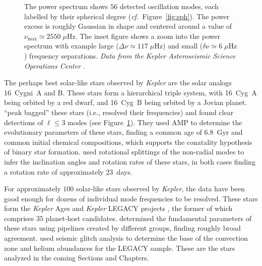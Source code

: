 \begin{figure}
{        %
        The power spectrum shows $56$ detected oscillation modes, each labelled by their spherical degree (\emph{cf.}~Figure~\ref{fig:sph}). 
        The power excess is roughly Gaussian in shape and centered around a value of ${\nu_{\max}\simeq 2550 \;\mu\text{Hz}}$. 
        The inset figure shows a zoom into the power spectrum with example large (${\Delta\nu \simeq 117\;\mu\text{Hz}}$) and small (${\delta\nu \simeq 6\;\mu\text{Hz}}$) frequency separations. 
        \emph{Data from the Kepler Asteroseismic Science Operations Center \citep{KASOC}.}
    \label{fig:16cygb}}
\end{figure}


The perhaps best solar-like stars observed by \emph{Kepler} are the solar analogs 16~Cygni~A and B. 
These stars form a hierarchical triple system, with 16~Cyg~A being orbited by a red dwarf, and 16~Cyg~B being orbited by a Jovian planet.  %
\citet{2012ApJ...748L..10M} ``peak bagged'' these stars (i.e., resolved their frequencies) and found clear detections of ${\ell\leq 3}$ modes (see Figure~\ref{fig:16cygb}). 
They used AMP to determine the evolutionary parameters of these stars, finding a common age of $6.8$~Gyr and common initial chemical compositions, which supports the conatality hypothesis of binary star formation. 
\citet{2015MNRAS.446.2959D} used rotational splittings of the non-radial modes to infer the inclination angles and rotation rates of these stars, in both cases finding a rotation rate of approximately $23$~days. 


For approximately $100$ solar-like stars observed by \emph{Kepler}, the data have been good enough for dozens of individual mode frequencies to be resolved. 
These stars form the \emph{Kepler} Ages \citep{2016MNRAS.456.2183D} and \emph{Kepler} LEGACY projects \citep{2017ApJ...835..172L}, the former of which comprises $35$ planet-host candidates. 
\citet{2015MNRAS.452.2127S, 2017ApJ...835..173S} determined the fundamental parameters of these stars using pipelines created by different groups, finding roughly broad agreement. 
\citet{2014ApJ...790..138V, 2017ApJ...837...47V} used seismic glitch analysis to determine the base of the convection zone and helium abundances for the LEGACY sample.
These are the stars analyzed in the coming Sections and Chapters.  





